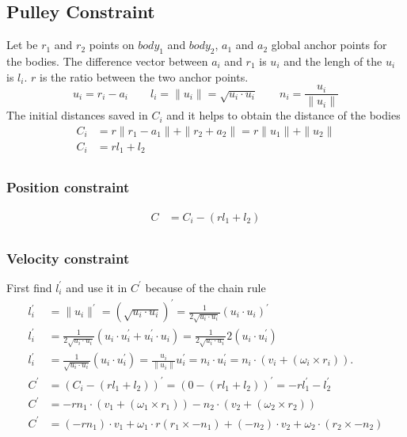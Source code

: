 \documentclass{article}
\begin{document}
		\subsection{Pulley Constraint}
				Let be $r_1$ and $r_2$ points on $body_1$ and $body_2$, $a_1$ and $a_2$ global anchor points for the bodies. The difference vector between $a_i$ and $r_1$ is $u_i$ and the lengh of the $u_i$ is $l_i$. $r$ is the ratio between the two anchor points.
				$$
						u_i = r_i - a_i
							\qquad 
						l_i = \| u_i \| = \sqrt{ u_i \cdot u_i }
							\qquad 
						n_i = \frac{u_i}{\| u_i \|}
				$$
				The initial distances saved in $C_i$ and it helps to obtain the distance of the bodies
				\begin{align*}
					C_i &= r\| r_1 - a_1 \| + \| r_2 + a_2 \| = r\| u_1 \| + \| u_2 \|\\
					C_i &= rl_1 + l_2\\
				\end{align*}
		\subsubsection{Position constraint}
		\begin{align*}
			C &= C_i - ( rl_1 + l_2 )\\
		\end{align*}
		\subsubsection{Velocity constraint}
		First find $l_i^{'}$ and use it in $C^{'}$ because of the chain rule
			\begin{align*}
				l_i^{'} &= \| u_i \|^{'} = (\sqrt{ u_i \cdot u_i })^{'}
						= \frac{ 1 }{ 2 \sqrt{ u_i \cdot u_i } } (u_i \cdot u_i)^{'}\\
				l_i^{'} &= \frac{ 1 }{ 2 \sqrt{ u_i \cdot u_i } } (u_i \cdot u_i^{'} + u_i^{'} \cdot u_i )
						= \frac{ 1 }{ 2 \sqrt{ u_i \cdot u_i } } 2(u_i \cdot u_i^{'})\\
				l_i^{'} &= \frac{ 1 }{ \sqrt{ u_i \cdot u_i } } (u_i \cdot u_i^{'})
						= \frac{ u_i }{ \| u_i \| } u_i^{'}
						= n_i \cdot u_i^{'}
						= n_i \cdot (v_i + (\omega_i \times r_i)).\\
				C^{'} &= (C_i - ( rl_1 + l_2 ))^{'} 
						= (0 - ( rl_1 + l_2 ))^{'}
						= -rl_1^{'} -l_2^{'}\\
				C^{'} &= -rn_1 \cdot (v_1 + (\omega_1 \times r_1)) - n_2 \cdot (v_2 + (\omega_2 \times r_2))\\
				C^{'} &= \boxed{(-rn_1)} \cdot v_1 + \omega_1 \cdot \boxed{ r(r_1 \times -n_1) } + \boxed{(-n_2)} \cdot v_2 + \omega_2 \cdot \boxed{ (r_2 \times -n_2) }
			\end{align*}
\end{document}
